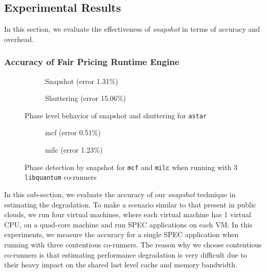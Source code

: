 \documentclass{sig-alternate}
\begin{document}
\subsection{Experimental Results}
\label{subsec:ExperimentalResults}
In this section, we evaluate the effectiveness of \textit{snapshot} in terms of accuracy and overhead.
\subsubsection{Accuracy of Fair Pricing Runtime Engine}
\label{subsubsec:AccuracyofFairPricingRuntimeEngine}
\begin{figure*}
\centering
\begin{subfigure}[t]{1\columnwidth}
\centering
{}
\caption{Snapshot (error 1.31\%)}
\label{fig:astarsnapshotlib}
\end{subfigure}
\hfill
\begin{subfigure}[t]{1\columnwidth}
\centering
{}
\caption{Shuttering (error 15.06\%)}
\label{fig:astarpriorlib}
\end{subfigure}
\caption{Phase level behavior of snapshot and shuttering for \texttt{astar}}
\label{fig:astarcompare}
\end{figure*}
\begin{figure*}
\centering
\begin{subfigure}[t]{1\columnwidth}
\centering
{}
\caption{mcf (error 0.51\%)}
\label{fig:mcfsnapshotlib}
\end{subfigure}
\hfill
\begin{subfigure}[t]{1\columnwidth}
\centering
{}
\caption{milc (error 1.23\%)}
\label{fig:milcsnapshotlib}
\end{subfigure}
\caption{Phase detection by snapshot for \texttt{mcf} and \texttt{milc} when running with 3 \texttt{libquantum} co-runners \vspace{-0.25in}}
\label{fig:mcfphase}
\end{figure*}

In this sub-section, we evaluate the accuracy of our \textit{snapshot} technique in estimating the degradation. To make a scenario similar to that present in public clouds, we run four virtual machines, where each virtual machine has 1 virtual CPU, on a quad-core machine and run SPEC applications on each VM. In this experiments, we measure the accuracy for a single SPEC application when running with three contentious co-runners. The reason why we choose contentious co-runners is that estimating performance degradation is very difficult due to their heavy impact on the shared last level cache and memory bandwidth.
\end{document}
